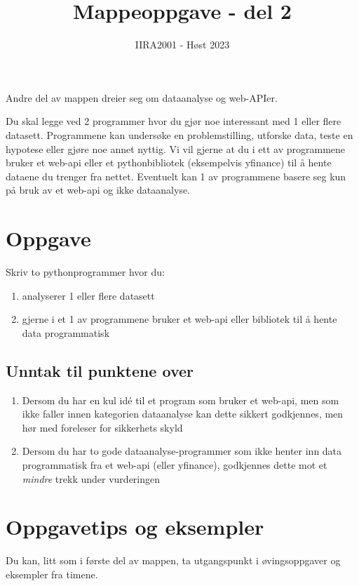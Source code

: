 \documentclass[12pt, titlepage]{article}
\begin{document}
\title{Mappeoppgave - del 2}
\author{IIRA2001 - Høst 2023}
\date{}
\maketitle


Andre del av mappen dreier seg om dataanalyse og web-APIer.

Du skal legge ved 2 programmer hvor du gjør noe interessant med 1 eller flere datasett.
Programmene kan undersøke en problemstilling, utforske data, teste en hypotese eller gjøre noe annet nyttig.
Vi vil gjerne at du i ett av programmene bruker et web-api eller et pythonbibliotek (eksempelvis yfinance) til å hente dataene du trenger fra nettet.
Eventuelt kan 1 av programmene basere seg kun på bruk av et web-api og ikke dataanalyse.


\section*{Oppgave}
Skriv to pythonprogrammer hvor du:
\begin{enumerate}[$\bullet$]
   \item {analyserer 1 eller flere datasett}
   \item {gjerne i et 1 av programmene bruker et web-api eller bibliotek til å hente data programmatisk}
\end{enumerate}

\subsection*{Unntak til punktene over}
\begin{enumerate}[$\bullet$]
   \item {Dersom du har en kul idé til et program som bruker et web-api, men som ikke faller innen kategorien dataanalyse kan dette sikkert godkjennes, men hør med foreleser for sikkerhets skyld}
   \item {Dersom du har to gode dataanalyse-programmer som ikke henter inn data programmatisk fra et web-api (eller yfinance), godkjennes dette mot et \textit{mindre} trekk under vurderingen}
\end{enumerate}

\section*{Oppgavetips og eksempler}

Du kan, litt som i første del av mappen, ta utgangspunkt i øvingsoppgaver og eksempler fra timene.
\end{document}
